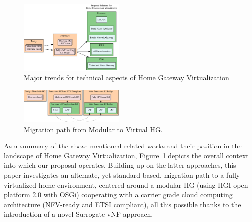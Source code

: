 \begin{figure}
  \begin{center}
    \includegraphics[width=0.45\textwidth]{fig/vhgtrends.pdf}
  \end{center}
  \caption{ Major trends for technical aspects of Home Gateway Virtualization
    \label{fig:trends}
  }
\end{figure}	
\begin{figure}
  \begin{center}
    \includegraphics[width=0.45\textwidth]{fig/migrationPath.pdf}
  \end{center}
  \caption{ Migration path from Modular to Virtual HG.
    \label{fig:migration}
  }
\end{figure}	
As a summary of the above-mentioned related works and their position in the landscape of Home Gateway Virtualization, Figure~\ref{fig:trends} depicts the overall context into which our proposal operates.
Building up on the latter approaches, this paper investigates an alternate, yet standard-based, migration path to a fully virtualized home environment, centered around a modular HG (using HGI open platform 2.0 with OSGi) cooperating with a carrier grade cloud computing architecture (NFV-ready and ETSI compliant), all this possible thanks to the introduction of a novel Surrogate vNF approach.




